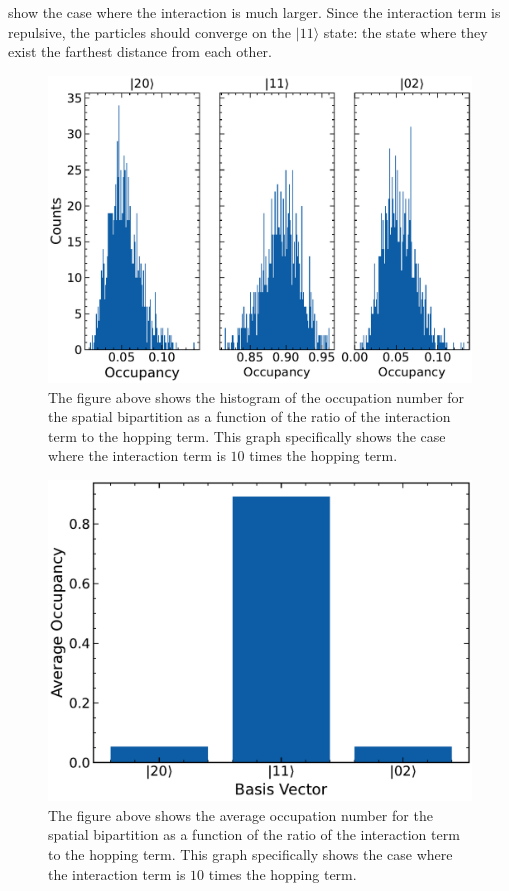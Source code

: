  show the case where the interaction is much larger. Since the interaction term is repulsive, the particles should converge on the $|11\rangle$ state: the state where they exist the farthest distance from each other.

\begin{figure}[H]
\centering
\includegraphics[scale=0.5]{../figures/sep_occ_hist_U_10.0000.pdf}
\caption{The figure above shows the histogram of the occupation number for the spatial bipartition as a function of the ratio of the interaction term to the hopping term. This graph specifically shows the case where the interaction term is $10$ times the hopping term.}
\label{fig:sep_occ_hist_U_10.0000}
\end{figure}

\begin{figure}[H]
\centering
\includegraphics[scale=0.5]{../figures/spatial_avg_occ_U_10.0000.pdf}
\caption{The figure above shows the average occupation number for the spatial bipartition as a function of the ratio of the interaction term to the hopping term. This graph specifically shows the case where the interaction term is $10$ times the hopping term.}
\label{fig:spatial_avg_occ_U_10.0000}    
\end{figure}

